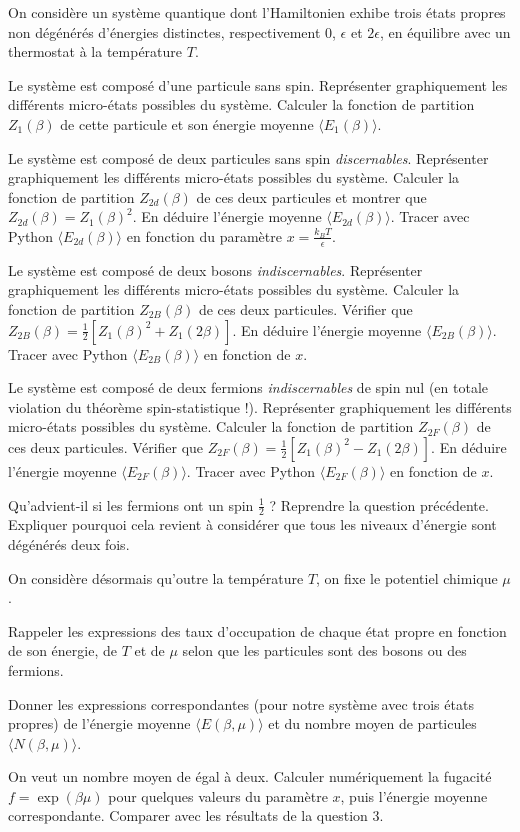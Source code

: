 On considère un système quantique dont l'Hamiltonien exhibe trois états propres non dégénérés d'énergies distinctes, respectivement 0, $\epsilon$ et $2\epsilon$, en équilibre avec un thermostat à la température $T$.

\medskip

\question
Le système est composé d'une particule sans spin. Représenter graphiquement les différents micro-états possibles du système. Calculer la fonction de partition $Z_1(\beta)$ de cette particule et son énergie moyenne $\langle E_1 (\beta) \rangle$.

\question
Le système est composé de deux particules sans spin \textit{discernables}. Représenter graphiquement les différents micro-états possibles du système. Calculer la fonction de partition $Z_{2d}(\beta)$ de ces deux particules et montrer que  $Z_{2d}(\beta)=Z_1(\beta)^2$. En déduire l'énergie moyenne $\langle E_{2d}(\beta) \rangle$. Tracer avec Python $\langle E_{2d}(\beta) \rangle$ en fonction du paramètre $x=\frac{k_BT}{\epsilon}$. 

\question
Le système est composé de deux bosons \textit{indiscernables}. Représenter graphiquement les différents micro-états possibles du système. Calculer la fonction de partition $Z_{2B}(\beta)$ de ces deux particules. Vérifier que  $Z_{2B}(\beta)=\frac{1}{2} [Z_1(\beta)^2+Z_1(2\beta)]$. En déduire l'énergie moyenne $\langle E_{2B}(\beta) \rangle$. Tracer avec Python $\langle E_{2B}(\beta) \rangle$ en fonction de $x$. 

\question
Le système est composé de deux fermions \textit{indiscernables} de spin nul (en totale violation du théorème spin-statistique !). Représenter graphiquement les différents micro-états possibles du système. Calculer la fonction de partition $Z_{2F}(\beta)$ de ces deux particules. Vérifier que  $Z_{2F}(\beta)=\frac{1}{2} [Z_1(\beta)^2-Z_1(2\beta)]$. En déduire l'énergie moyenne $\langle E_{2F}(\beta) \rangle$. Tracer avec Python $\langle E_{2F}(\beta) \rangle$ en fonction de $x$. 

\question
Qu'advient-il si les fermions ont un spin $\frac{1}{2}$ ? Reprendre la question précédente. Expliquer pourquoi cela revient à considérer que tous les niveaux d'énergie sont dégénérés deux fois.

\medskip

On considère désormais qu'outre la température $T$, on fixe le potentiel chimique $\mu$.

\medskip

\question
Rappeler les expressions des taux d'occupation de chaque état propre en fonction de son énergie, de $T$ et de $\mu$ selon que les particules sont des bosons ou des fermions.

\question
Donner les expressions correspondantes (pour notre système avec trois états propres) de l'énergie moyenne $\langle E (\beta,\mu) \rangle$ et du nombre moyen de particules $\langle N(\beta,\mu) \rangle$.

\question
On veut un nombre moyen de  égal à deux. Calculer numériquement la fugacité $f=\exp(\beta \mu)$ pour quelques valeurs du paramètre $x$, puis l'énergie moyenne correspondante. Comparer avec les résultats de la question 3.  
